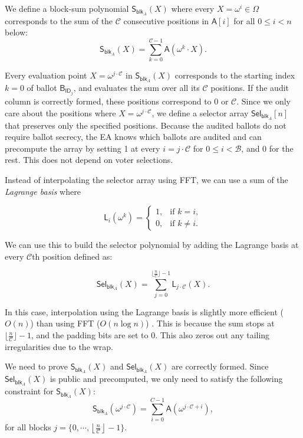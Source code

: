 We define a block-sum polynomial $\mathsf{S}_{\mathsf{blk}_A}(X)$ where every $X=\omega^i\in\Omega$ corresponds to the sum of the $\mathcal{C}$ consecutive positions in $\mathsf{A}[i]$ for all $0\le i<n$ below:
\begin{equation}
  \label{eq:blksum1}
  \mathsf{S}_{\mathsf{blk}_A}(X) = \sum_{k=0}^{\mathcal{C}-1} \mathsf{A}(\omega^k\cdot X).
\end{equation} 

Every evaluation point $X = \omega^{j\cdot \mathcal{C}}$ in $\mathsf{S}_{\mathsf{blk}_A}(X)$ corresponds to the starting index $k = 0$ of ballot $\mathsf{B}_{\mathsf{ID}_j}$, and evaluates the sum over all its $\mathcal{C}$ positions.
If the audit column is correctly formed, these positions correspond to 0 or $\mathcal{C}$. 
Since we only care about the positions where $X = \omega^{j\cdot \mathcal{C}}$, we define a selector array $\mathsf{Sel}_{\mathsf{blk}_A}[n]$ that preserves only the specified positions. 
Because the audited ballots do not require ballot secrecy, the EA knows which ballots are audited and can precompute the array by setting 1 at every $i=j\cdot\mathcal{C}$ for $0\le i < \mathcal{B}$, and 0 for the rest. 
This does not depend on voter selections.

Instead of interpolating the selector array using FFT, we can use a sum of the \textit{Lagrange basis} where
 
\[
\mathsf{L}_i(\omega^k) =
\begin{cases}
  1, & \text{if } k = i, \\
  0, & \text{if } k \neq i.
\end{cases}
\]

We can use this to build the selector polynomial by adding the Lagrange basis at every $\mathcal{C}$th position defined as:

\begin{equation}
\label{eq:selA}
\mathsf{Sel}_{\mathsf{blk}_A}(X) = \sum_{j=0}^{\lfloor \frac{n}{\mathcal{C}}\rfloor - 1} \mathsf{L}_{j \cdot\mathcal{C}}(X).
\end{equation}

In this case, interpolation using the Lagrange basis is slightly more efficient ($O(n)$) than using FFT ($O(n\log n)$) \cite{Lagrange}. 
This is because the sum stops at $\lfloor \frac{n}{\mathcal{C}}  \rfloor - 1$, and the padding bits are set to 0. 
This also zeros out any tailing irregularities due to the wrap.

We need to prove $\mathsf{S}_{\mathsf{blk}_A}(X)$ and $\mathsf{Sel}_{\mathsf{blk}_A}(X)$ are correctly formed. 
Since $\mathsf{Sel}_{\mathsf{blk}_A}(X)$ is public and precomputed, we only need to satisfy the following constraint for $\mathsf{S}_{\mathsf{blk}_A}(X)$:
\[
  \mathsf{S}_{\mathsf{blk}_A}(\omega^{j\cdot\mathcal{C}}) = \sum_{i=0}^{C-1} \mathsf{A}(\omega^{j\cdot\mathcal{C}+i}),
\] 
for all blocks $j= \{0,\cdots,\left\lfloor \frac{n}{\mathcal{C}} \right\rfloor-1\}$. 

